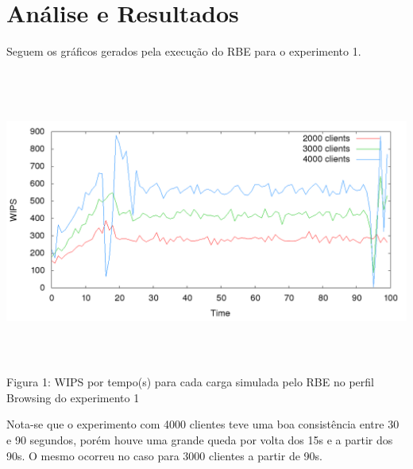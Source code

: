 \documentclass[11pt,twoside]{article}
\begin{document}
\section{An\'alise e Resultados}
\setlength{\parindent}{4ex}

Seguem os gráficos gerados pela execução do RBE para o experimento 1.
\begin{center}
\includegraphics[width=15cm, height=10cm]{images/exp1/plot_browsin}
Figura 1: WIPS por tempo(s) para cada carga simulada pelo RBE no perfil Browsing do experimento 1
\end{center}
Nota-se que o experimento com 4000 clientes teve uma boa consistência entre 30 e 90 segundos, porém houve uma grande queda por volta dos 15s e a partir dos 90s. O mesmo ocorreu no caso para 3000 clientes a partir de 90s.
\end{document}
